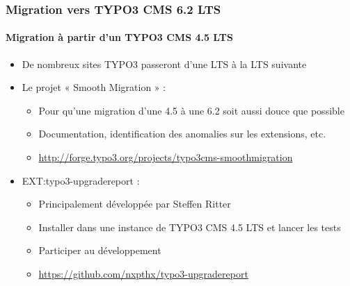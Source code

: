 
\begin{frame}[fragile]
	\frametitle{Migration vers TYPO3 CMS 6.2 LTS}	
	\framesubtitle{Migration à partir d'un TYPO3 CMS 4.5 LTS}

	\begin{itemize}
		\item De nombreux sites TYPO3 passeront d'une LTS à la LTS suivante
		\item Le projet « Smooth Migration » :

			\begin{itemize}
				\item Pour qu'une migration d'une 4.5 à une 6.2 soit aussi douce que possible
				\item Documentation, identification des anomalies sur les extensions, etc.
				\item \smaller\url{http://forge.typo3.org/projects/typo3cms-smoothmigration}\normalsize
			\end{itemize}

		\item EXT:typo3-upgradereport :

			\begin{itemize}
				\item Principalement développée par Steffen Ritter
				\item Installer dans une instance de TYPO3 CMS 4.5 LTS et lancer les tests
				\item Participer au développement
				\item \smaller\url{https://github.com/nxpthx/typo3-upgradereport}\normalsize
			\end{itemize}
	\end{itemize}

\end{frame}


